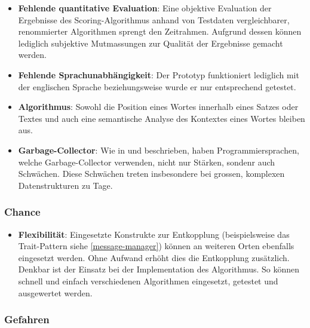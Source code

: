 \begin{itemize}
    \item \textbf{Fehlende quantitative Evaluation}: Eine objektive Evaluation der Ergebnisse des Scoring-Algorithmus anhand von Testdaten vergleichbarer, renommierter Algorithmen sprengt den Zeitrahmen. Aufgrund dessen können lediglich subjektive Mutmassungen zur Qualität der Ergebnisse gemacht werden.
    \item \textbf{Fehlende Sprachunabhängigkeit}: Der Prototyp funktioniert lediglich mit der englischen Sprache beziehungsweise wurde er nur entsprechend getestet.
    \item \textbf{Algorithmus}: Sowohl die Position eines Wortes innerhalb eines Satzes oder Textes und auch eine semantische Analyse des Kontextes eines Wortes bleiben aus.
    \item \textbf{Garbage-Collector}: Wie in \cite[S.~1-3]{cohen2015data} und \cite[S.~1-2]{nguyen2016yak} beschrieben, haben Programmiersprachen, welche Garbage-Collector verwenden, nicht nur Stärken, sondenr auch Schwächen. Diese Schwächen treten insbesondere bei grossen, komplexen Datenstrukturen zu Tage.
    
\end{itemize}

\subsubsection{Chance}

\begin{itemize}
    \item \textbf{Flexibilität}: Eingesetzte Konstrukte zur Entkopplung (beispielsweise das Trait-Pattern siehe \autoref{message-manager}) können an weiteren Orten ebenfalls eingesetzt werden. Ohne Aufwand er\-höht dies die Entkopplung zusätzlich. Denkbar ist der Einsatz bei der Implementation des Algorithmus. So können schnell und einfach verschiedenen Algorithmen eingesetzt, getestet und ausgewertet werden.
\end{itemize}


\subsubsection{Gefahren}

